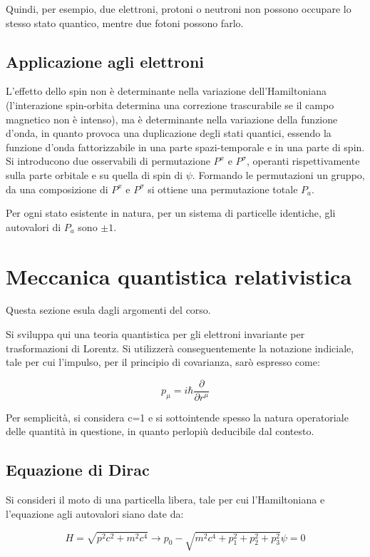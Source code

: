 \documentclass{report}
\begin{document}
Quindi, per esempio, due elettroni, protoni o neutroni non possono occupare lo stesso stato quantico, mentre due fotoni possono farlo.

\subsection*{Applicazione agli elettroni}
L'effetto dello spin non è determinante nella variazione dell'Hamiltoniana (l'interazione spin-orbita determina una correzione trascurabile se il campo
magnetico non è intenso), ma è determinante nella variazione della funzione d'onda, in quanto provoca una duplicazione degli stati quantici,
essendo la funzione d'onda fattorizzabile in una parte spazi-temporale e in una parte di spin.
Si introducono due osservabili di permutazione $P^x$ e $P^\sigma$, operanti rispettivamente sulla parte orbitale e su quella di spin di $\psi$.
Formando le permutazioni un gruppo, da una composizione di $P^x$ e $P^\sigma$ si ottiene una permutazione totale $P_a$.

Per ogni stato esistente in natura, per un sistema di particelle identiche, gli autovalori di $P_a$ sono $\pm 1$.

\section{Meccanica quantistica relativistica}
Questa sezione esula dagli argomenti del corso.

Si sviluppa qui una teoria quantistica per gli elettroni invariante per trasformazioni di Lorentz.
Si utilizzerà conseguentemente la notazione indiciale, tale per cui l'impulso, per il principio di covarianza, sarò espresso come:

\begin{equation}
  p_\mu=i\hbar\frac{\partial}{\partial r^{\mu}}
\end{equation}


Per semplicità, si considera c=1 e si sottointende spesso la natura operatoriale delle quantità in questione, in quanto perlopiù deducibile
dal contesto.

\subsection{Equazione di Dirac}


Si consideri il moto di una particella libera, tale per cui l'Hamiltoniana e l'equazione agli autovalori siano date da:

\begin{equation}
  H=\sqrt{p^2c^2+m^2c^4} \rightarrow p_0-\sqrt{m^2c^4+p_1^2+p_2^2+p_3^2}\psi=0
\end{equation}
\end{document}
